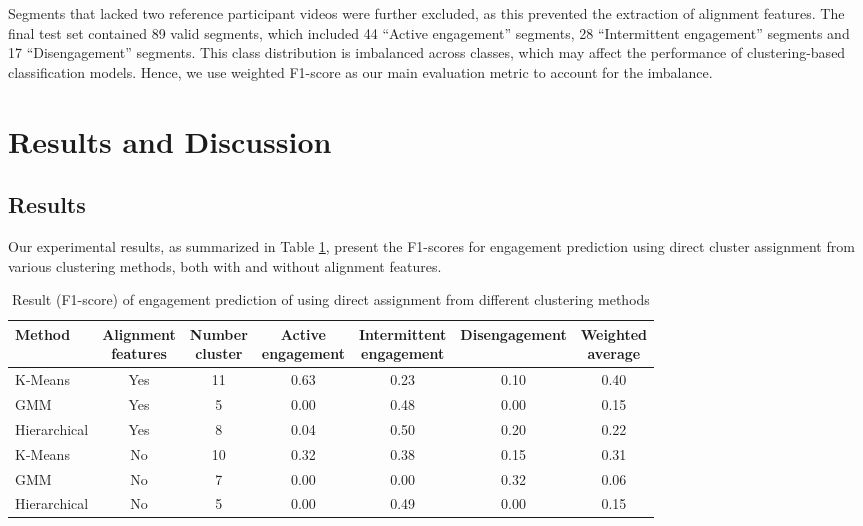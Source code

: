 \documentclass[
]{ceurart}
\begin{document}
Segments that lacked two reference participant videos were further excluded, as this prevented the extraction of alignment features. The final test set contained 89 valid segments, which included 44 “Active engagement” segments, 28 “Intermittent engagement” segments and 17 “Disengagement” segments. This class distribution is imbalanced across classes, which may affect the performance of clustering-based classification models. Hence, we use weighted F1-score as our main evaluation metric to account for the imbalance.



\section{Results and Discussion}
\subsection{Results}

Our experimental results, as summarized in Table \ref{tab:result}, present the F1-scores for engagement prediction using direct cluster assignment from various clustering methods, both with and without alignment features.

\begin{table}[ht]
  \caption{Result (F1-score) of engagement prediction of using direct assignment from different clustering methods}
  \label{tab:result}
  \centering
  \begin{tabular}{lcccccc}
    \toprule
    Method & \makecell{Alignment\\features} &\makecell{Number\\cluster}& \makecell{Active\\engagement} &  \makecell{Intermittent\\engagement} & Disengagement & \makecell{Weighted\\average} \\
    \midrule
    K-Means         & Yes &11& 0.63 & 0.23  & 0.10  & 0.40  \\
    GMM             & Yes &5& 0.00 & 0.48  & 0.00  & 0.15  \\
    Hierarchical    & Yes &8& 0.04 & 0.50  & 0.20  & 0.22  \\
    K-Means         & No  &10& 0.32 & 0.38  & 0.15  & 0.31 \\
    GMM             & No  &7& 0.00 & 0.00  & 0.32  & 0.06  \\
    Hierarchical    & No  &5& 0.00 & 0.49  & 0.00  & 0.15  \\
        \bottomrule
  \end{tabular}
\end{table}
\end{document}
